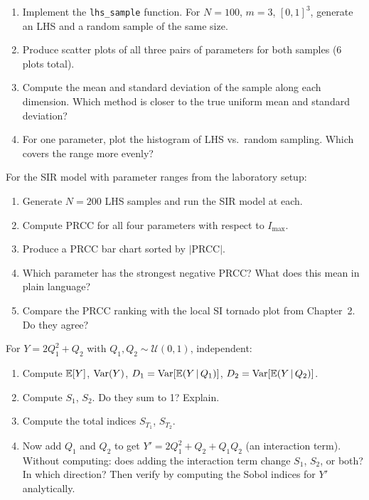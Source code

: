 \begin{exercise}[\bloom{L3}]
\label{ex:ch9:LHS}
\begin{enumerate}[label=(\alph*)]
  \item Implement the \texttt{lhs\_sample} function. For $N = 100$,
        $m = 3$, $[0,1]^3$, generate an LHS and a random sample of the
        same size.
  \item Produce scatter plots of all three pairs of parameters for
        both samples (6 plots total).
  \item Compute the mean and standard deviation of the sample along each
        dimension. Which method is closer to the true uniform
        mean and standard deviation?
  \item For one parameter, plot the histogram of LHS vs.\ random
        sampling. Which covers the range more evenly?
\end{enumerate}
\end{exercise}

\begin{exercise}[\bloom{L3}]
\label{ex:ch9:PRCC}
For the SIR model with parameter ranges from the laboratory setup:
\begin{enumerate}[label=(\alph*)]
  \item Generate $N = 200$ LHS samples and run the SIR model at each.
  \item Compute PRCC for all four parameters with respect to $I_{\max}$.
  \item Produce a PRCC bar chart sorted by $|$PRCC$|$.
  \item Which parameter has the strongest negative PRCC? What does this
        mean in plain language?
  \item Compare the PRCC ranking with the local SI tornado plot from
        Chapter~2. Do they agree?
\end{enumerate}
\end{exercise}

\begin{exercise}[\bloom{L4}]
\label{ex:ch9:sobolanalytic}
For $Y = 2Q_1^2 + Q_2$ with $Q_1, Q_2 \sim \mathcal{U}(0,1)$, independent:
\begin{enumerate}[label=(\alph*)]
  \item Compute $\mathbb{E}[Y]$, $\operatorname{Var}(Y)$, $D_1 = \operatorname{Var}[\mathbb{E}(Y\,|\,Q_1)]$,
        $D_2 = \operatorname{Var}[\mathbb{E}(Y\,|\,Q_2)]$.
  \item Compute $S_1$, $S_2$. Do they sum to 1? Explain.
  \item Compute the total indices $S_{T_1}$, $S_{T_2}$.
  \item Now add $Q_1$ and $Q_2$ to get $Y' = 2Q_1^2 + Q_2 + Q_1 Q_2$
        (an interaction term). Without computing: does adding the interaction
        term change $S_1$, $S_2$, or both? In which direction?
        Then verify by computing the Sobol indices for $Y'$ analytically.
\end{enumerate}
\end{exercise}

